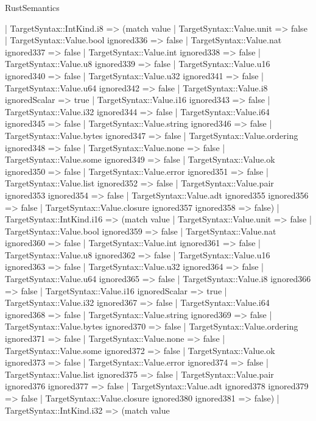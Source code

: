\begin{lexlean}{RustSemantics}
\begin{semanticmodule}
{    | TargetSyntax::IntKind.i8 => (match value
      | TargetSyntax::Value.unit => false
      | TargetSyntax::Value.bool ignored336 => false
      | TargetSyntax::Value.nat ignored337 => false
      | TargetSyntax::Value.int ignored338 => false
      | TargetSyntax::Value.u8 ignored339 => false
      | TargetSyntax::Value.u16 ignored340 => false
      | TargetSyntax::Value.u32 ignored341 => false
      | TargetSyntax::Value.u64 ignored342 => false
      | TargetSyntax::Value.i8 ignoredScalar => true
      | TargetSyntax::Value.i16 ignored343 => false
      | TargetSyntax::Value.i32 ignored344 => false
      | TargetSyntax::Value.i64 ignored345 => false
      | TargetSyntax::Value.string ignored346 => false
      | TargetSyntax::Value.bytes ignored347 => false
      | TargetSyntax::Value.ordering ignored348 => false
      | TargetSyntax::Value.none => false
      | TargetSyntax::Value.some ignored349 => false
      | TargetSyntax::Value.ok ignored350 => false
      | TargetSyntax::Value.error ignored351 => false
      | TargetSyntax::Value.list ignored352 => false
      | TargetSyntax::Value.pair ignored353 ignored354 => false
      | TargetSyntax::Value.adt ignored355 ignored356 => false
      | TargetSyntax::Value.closure ignored357 ignored358 => false)
    | TargetSyntax::IntKind.i16 => (match value
      | TargetSyntax::Value.unit => false
      | TargetSyntax::Value.bool ignored359 => false
      | TargetSyntax::Value.nat ignored360 => false
      | TargetSyntax::Value.int ignored361 => false
      | TargetSyntax::Value.u8 ignored362 => false
      | TargetSyntax::Value.u16 ignored363 => false
      | TargetSyntax::Value.u32 ignored364 => false
      | TargetSyntax::Value.u64 ignored365 => false
      | TargetSyntax::Value.i8 ignored366 => false
      | TargetSyntax::Value.i16 ignoredScalar => true
      | TargetSyntax::Value.i32 ignored367 => false
      | TargetSyntax::Value.i64 ignored368 => false
      | TargetSyntax::Value.string ignored369 => false
      | TargetSyntax::Value.bytes ignored370 => false
      | TargetSyntax::Value.ordering ignored371 => false
      | TargetSyntax::Value.none => false
      | TargetSyntax::Value.some ignored372 => false
      | TargetSyntax::Value.ok ignored373 => false
      | TargetSyntax::Value.error ignored374 => false
      | TargetSyntax::Value.list ignored375 => false
      | TargetSyntax::Value.pair ignored376 ignored377 => false
      | TargetSyntax::Value.adt ignored378 ignored379 => false
      | TargetSyntax::Value.closure ignored380 ignored381 => false)
    | TargetSyntax::IntKind.i32 => (match value
}
\end{semanticmodule}
\end{lexlean}
